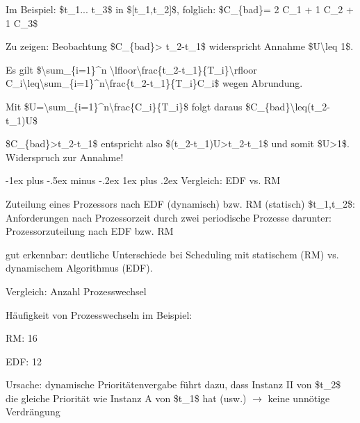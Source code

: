 \documentclass[a4paper]{article}
\makeatletter
\renewcommand{\subsubsection}{\@startsection{subsubsection}{3}{0mm}%
 {-1ex plus -.5ex minus -.2ex}%
 {1ex plus .2ex}%
 {\normalfont\small\bfseries}}
\makeatother
\begin{document}
\begin{multicols}{3}
\begin{itemize*}
\begin{itemize*}
\begin{itemize*}
                \item   Im Beispiel: \$t\_1... t\_3\$ in \${[}t\_1,t\_2{]}\$, folglich:   \$C\_\{bad\}= 2 C\_1 + 1 C\_2 + 1 C\_3\$
                \item   Zu zeigen: Beobachtung \$C\_\{bad\}\textgreater{} t\_2-t\_1\$   widerspricht Annahme \$U\textbackslash leq 1\$.
                \item   Es gilt \$\textbackslash sum\_\{i=1\}\^{}n   \textbackslash lfloor\textbackslash frac\{t\_2-t\_1\}\{T\_i\}\textbackslash rfloor   C\_i\textbackslash leq\textbackslash sum\_\{i=1\}\^{}n\textbackslash frac\{t\_2-t\_1\}\{T\_i\}C\_i\$   wegen Abrundung.
                \item   Mit   \$U=\textbackslash sum\_\{i=1\}\^{}n\textbackslash frac\{C\_i\}\{T\_i\}\$   folgt daraus \$C\_\{bad\}\textbackslash leq(t\_2-t\_1)U\$
                \item   \$C\_\{bad\}\textgreater t\_2-t\_1\$ entspricht also   \$(t\_2-t\_1)U\textgreater t\_2-t\_1\$ und somit   \$U\textgreater1\$. Widerspruch zur Annahme!
            \end{itemize*}
        \end{itemize*}
    \end{itemize*}


    \subsubsection{Vergleich: EDF vs. RM}

    Zuteilung eines Prozessors nach EDF (dynamisch) bzw. RM (statisch)
    \$t\_1,t\_2\$: Anforderungen nach Prozessorzeit durch zwei periodische
    Prozesse darunter: Prozessorzuteilung nach EDF bzw. RM

    \begin{itemize*}
        \item
        gut erkennbar: deutliche Unterschiede bei Scheduling mit statischem
        (RM) vs. dynamischem Algorithmus (EDF).
    \end{itemize*}

    Vergleich: Anzahl Prozesswechsel

    \begin{itemize*}
        \item
        Häufigkeit von Prozesswechseln im Beispiel:
        \begin{itemize*}
            \item RM: 16
            \item EDF: 12
        \end{itemize*}
        \item
        Ursache: dynamische Prioritätenvergabe führt dazu, dass Instanz II von
        \$t\_2\$ die gleiche Priorität wie Instanz A von \$t\_1\$ hat (usw.)
        $\rightarrow$  keine unnötige Verdrängung
    \end{itemize*}


\end{multicols}
\end{document}
